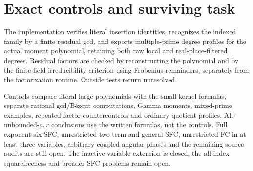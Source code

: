 \documentclass[11pt]{article}
\begin{document}
\section{Exact controls and surviving task}
\href{mixed_prime_windows.py}{The implementation} verifies literal
insertion identities, recognizes the indexed family by a finite residual
gcd, and exports multiple-prime degree profiles for the actual moment
polynomial, retaining both raw local and real-place-filtered degrees. Residual factors are checked by reconstructing the polynomial
and by the finite-field irreducibility criterion using Frobenius remainders,
separately from the factorization routine. Outside tests return unresolved.

Controls compare literal large polynomials with the small-kernel formulas,
separate rational gcd/B\'ezout computations, Gamma moments, mixed-prime
examples, repeated-factor countercontrols and ordinary quotient profiles.
All-unbounded-$a,r$ conclusions use the written formulas, not the controls.
Full exponent-six SFC, unrestricted two-term and general SFC, unrestricted
FC in at least three variables, arbitrary coupled angular phases and the
remaining source audits are still open. The inactive-variable extension is closed; the all-index squarefreeness
and broader SFC problems remain open.
\end{document}

